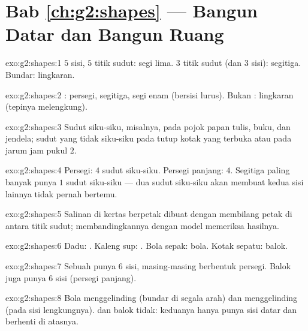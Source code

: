 \section*{Bab \ref{ch:g2:shapes} --- Bangun Datar dan Bangun Ruang}

\begin{solution}{exo:g2:shapes:1}
$5$ sisi, $5$ titik sudut: segi lima. $3$ titik sudut (dan $3$ sisi):
segitiga. Bundar: lingkaran.
\end{solution}

\begin{solution}{exo:g2:shapes:2}
: persegi, segitiga, segi enam (bersisi lurus). Bukan
: lingkaran (tepinya melengkung).
\end{solution}

\begin{solution}{exo:g2:shapes:3}
Sudut siku-siku, misalnya, pada pojok papan tulis, buku, dan jendela;
sudut yang tidak siku-siku pada tutup kotak yang terbuka atau pada
jarum jam pukul $2$.
\end{solution}

\begin{solution}{exo:g2:shapes:4}
Persegi: $4$ sudut siku-siku. Persegi panjang: $4$. Segitiga paling
banyak punya $1$ sudut siku-siku --- dua sudut siku-siku akan membuat
kedua sisi lainnya tidak pernah bertemu.
\end{solution}

\begin{solution}{exo:g2:shapes:5}
Salinan di kertas berpetak dibuat dengan membilang petak di antara
titik sudut; membandingkannya dengan model memeriksa hasilnya.
\end{solution}

\begin{solution}{exo:g2:shapes:6}
Dadu: . Kaleng sup: . Bola sepak: bola. Kotak sepatu: balok.
\end{solution}

\begin{solution}{exo:g2:shapes:7}
Sebuah  punya $6$ sisi, masing-masing berbentuk persegi. Balok
juga punya $6$ sisi (persegi panjang).
\end{solution}

\begin{solution}{exo:g2:shapes:8}
Bola menggelinding (bundar di segala arah) dan  menggelinding
(pada sisi lengkungnya).  dan balok tidak: keduanya hanya punya
sisi datar dan berhenti di atasnya.
\end{solution}

